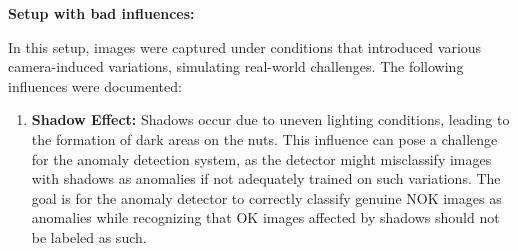 \documentclass[12pt,DIV14,BCOR12mm,a4paper,footinclude=false,headinclude,parskip=half-,twoside,openright,cleardoublepage=empty,toc=index,bibliography=totoc,listof=totoc]{scrreprt}
\numberwithin{equation}{chapter}
\begin{document}
\textbf{Setup with bad influences:}

In this setup, images were captured under conditions that introduced various camera-induced variations, simulating real-world challenges. The following influences were documented:

\begin{enumerate}
	\item \textbf{Shadow Effect:} Shadows occur due to uneven lighting conditions, leading to the formation of dark areas on the nuts. This influence can pose a challenge for the anomaly detection system, as the detector might misclassify images with shadows as anomalies if not adequately trained on such variations. The goal is for the anomaly detector to correctly classify genuine NOK images as anomalies while recognizing that OK images affected by shadows should not be labeled as such.


\end{enumerate}
\end{document}
